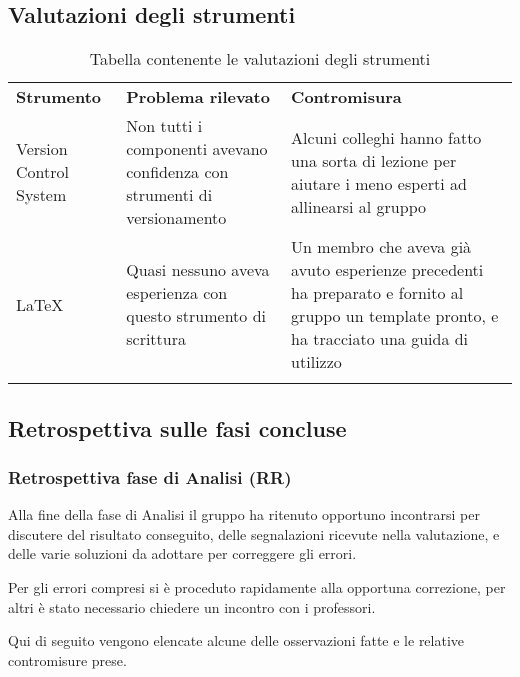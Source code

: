 \documentclass[../piano_di_qualifica.tex]{subfiles}
\begin{document}
\subsection{Valutazioni degli strumenti}
\label{sub:valut_strumenti}

\begin{center}
	\begin{longtable}{|p{3cm}|p{4.5cm}|p{4.5cm}|}
		\hline
		\rowcolor{lightgray}
		\textbf{Strumento}                                                       & \textbf{Problema rilevato} & \textbf{Contromisura}                 \\
		Version Control System                                                   &
		Non tutti i componenti avevano confidenza con strumenti di versionamento &
		Alcuni colleghi hanno fatto una sorta di lezione per aiutare i meno esperti ad allinearsi al gruppo                                           \\
		\LaTeX                                                                   &
		Quasi nessuno aveva esperienza con questo strumento di scrittura         &
		Un membro che aveva già avuto esperienze precedenti ha preparato e fornito al gruppo un template pronto, e ha tracciato una guida di utilizzo \\
		\hline
		\rowcolor{white}
		\caption{Tabella contenente le valutazioni degli strumenti}
	\end{longtable}
\end{center}

\subsection{Retrospettiva sulle fasi concluse}
\label{sub:retrospettiva}

\subsubsection{Retrospettiva fase di Analisi (RR)}
\label{par:retrospettiva-RR}
Alla fine della fase di Analisi il gruppo ha ritenuto opportuno incontrarsi per discutere del risultato conseguito, delle segnalazioni ricevute nella valutazione, e delle varie soluzioni da adottare per correggere gli errori.

Per gli errori compresi si è proceduto rapidamente alla opportuna correzione, per altri è stato necessario chiedere un incontro
con i professori.

Qui di seguito vengono elencate alcune delle osservazioni fatte e le relative contromisure prese.
\end{document}
